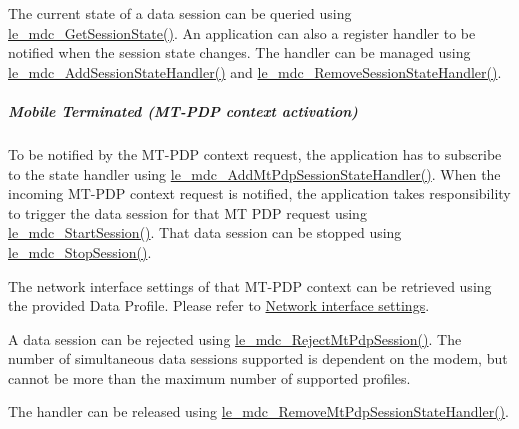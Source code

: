 The current state of a data session can be queried using \hyperlink{le__mdc__interface_8h_add91c364e8b3e4e82a0ce64e480c016b}{le\+\_\+mdc\+\_\+\+Get\+Session\+State()}. An application can also a register handler to be notified when the session state changes. The handler can be managed using \hyperlink{le__mdc__interface_8h_a594c85c1ccb56ddfbaf36496f35f681e}{le\+\_\+mdc\+\_\+\+Add\+Session\+State\+Handler()} and \hyperlink{le__mdc__interface_8h_af223a193b73ce6f870947557f69136dc}{le\+\_\+mdc\+\_\+\+Remove\+Session\+State\+Handler()}.\hypertarget{c_mdc_le_mdc_session_MT}{}\subparagraph{Mobile Terminated (\+M\+T-\/\+P\+D\+P context activation)}\label{c_mdc_le_mdc_session_MT}
To be notified by the M\+T-\/\+P\+DP context request, the application has to subscribe to the state handler using \hyperlink{le__mdc__interface_8h_ada19c2a399ba8c0aa038e27c21689472}{le\+\_\+mdc\+\_\+\+Add\+Mt\+Pdp\+Session\+State\+Handler()}. When the incoming M\+T-\/\+P\+DP context request is notified, the application takes responsibility to trigger the data session for that MT P\+DP request using \hyperlink{le__mdc__interface_8h_a2cb08d5c3e6c43297d80448891719649}{le\+\_\+mdc\+\_\+\+Start\+Session()}. That data session can be stopped using \hyperlink{le__mdc__interface_8h_a53453f85065c3cace0922150b7e3d869}{le\+\_\+mdc\+\_\+\+Stop\+Session()}.

The network interface settings of that M\+T-\/\+P\+DP context can be retrieved using the provided Data Profile. Please refer to \hyperlink{c_mdc_le_mdc_session_networkItf}{Network interface settings}.

A data session can be rejected using \hyperlink{le__mdc__interface_8h_ae3b49edad910960b84a9012ecc33c66a}{le\+\_\+mdc\+\_\+\+Reject\+Mt\+Pdp\+Session()}. The number of simultaneous data sessions supported is dependent on the modem, but cannot be more than the maximum number of supported profiles.

The handler can be released using \hyperlink{le__mdc__interface_8h_a68b03606241ea2215e076966a7c08d99}{le\+\_\+mdc\+\_\+\+Remove\+Mt\+Pdp\+Session\+State\+Handler()}.

